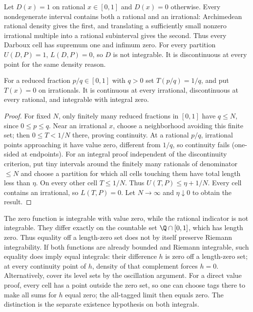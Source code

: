 \begin{example}
Let $D(x)=1$ on rational $x\in[0,1]$ and $D(x)=0$ otherwise.
Every nondegenerate interval contains both a rational and an irrational:
Archimedean rational density gives the first, and translating a sufficiently
small nonzero irrational multiple into a rational subinterval gives the
second. Thus every Darboux cell has supremum one and infimum zero.
For every partition $U(D,P)=1$, $L(D,P)=0$, so $D$ is not integrable.
It is discontinuous at every point for the same density reason.
\end{example}

\begin{example}
For a reduced fraction $p/q\in[0,1]$ with $q>0$ set $T(p/q)=1/q$,
and put $T(x)=0$ on irrationals. It is continuous at every irrational,
discontinuous at every rational, and integrable with integral zero.
\end{example}
\begin{proof}
For fixed $N$, only finitely many reduced fractions in $[0,1]$ have
$q\le N$, since $0\le p\le q$. Near an irrational $x$, choose a
neighborhood avoiding this finite set; then $0\le T<1/N$ there, proving
continuity. At a rational $p/q$, irrational points approaching it have
value zero, different from $1/q$, so continuity fails (one-sided at
endpoints). For an integral proof independent of the discontinuity criterion,
put tiny intervals around the finitely many rationals of denominator
$\le N$ and choose a partition for which all cells touching them have
total length less than $\eta$. On every other cell $T\le1/N$.
Thus $U(T,P)\le\eta+1/N$. Every cell contains an irrational, so
$L(T,P)=0$. Let $N\to\infty$ and $\eta\downarrow0$ to obtain the result.
\end{proof}

\begin{example}
The zero function is integrable with value zero, while the rational
indicator is not integrable. They differ exactly on the countable set
$\Q\cap[0,1]$, which has length zero. Thus equality off a length-zero
set does not by itself preserve Riemann integrability. If both functions
are already bounded and Riemann integrable, such equality does imply
equal integrals: their difference $h$ is zero off a length-zero set;
at every continuity point of $h$, density of that complement forces
$h=0$. Alternatively, cover its level sets by the oscillation argument.
For a direct value proof, every cell has a point outside the zero set,
so one can choose tags there to make all sums for $h$ equal zero; the
all-tagged limit then equals zero. The distinction is the separate
existence hypothesis on both integrals.
\end{example}

